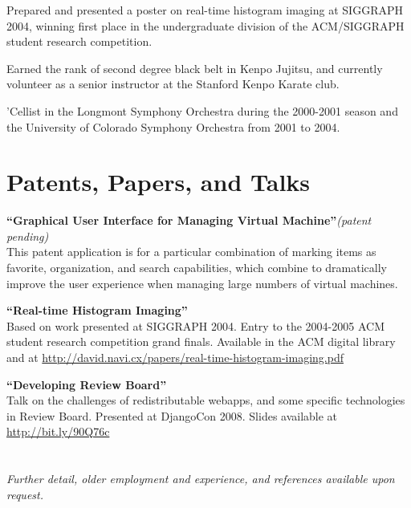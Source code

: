 \documentclass[margin,line]{resume}
\begin{document}
\begin{resume}
    \begin{list2}
    \item Prepared and presented a poster on real-time histogram imaging at
          SIGGRAPH 2004, winning first place in the undergraduate division
          of the ACM/SIGGRAPH student research competition.
    \item Earned the rank of second degree black belt in Kenpo Jujitsu, and
          currently volunteer as a senior instructor at the Stanford Kenpo
          Karate club.
    \ifcv
        \item 'Cellist in the Longmont Symphony Orchestra during the 2000-2001
              season and the University of Colorado Symphony Orchestra from 2001
              to 2004.
    \fi
    \end{list2}


    \section{\mysidestyle Patents, Papers, and Talks}

    {\bf``Graphical User Interface for Managing Virtual Machine''}{\it (patent pending)} \vspace{2mm}\\\vspace{1mm}%
    This patent application is for a particular combination of marking
    items as favorite, organization, and search capabilities, which combine
    to dramatically improve the user experience when managing large numbers
    of virtual machines.

    {\bf``Real-time Histogram Imaging''} \vspace{2mm}\\\vspace{1mm}%
    Based on work presented at SIGGRAPH 2004.  Entry to the 2004-2005 ACM
    student research competition grand finals. Available in the ACM digital
    library and at
    \url{http://david.navi.cx/papers/real-time-histogram-imaging.pdf}

    {\bf``Developing Review Board''} \vspace{2mm}\\\vspace{1mm}%
    Talk on the challenges of redistributable webapps, and some specific
    technologies in Review Board. Presented at DjangoCon 2008. Slides
    available at \url{http://bit.ly/90Q76c}


    \ifcv
    \else
        \section{}
        {\sl Further detail, older employment and experience, and references available upon request.}
    \fi


\end{resume}
\end{document}
